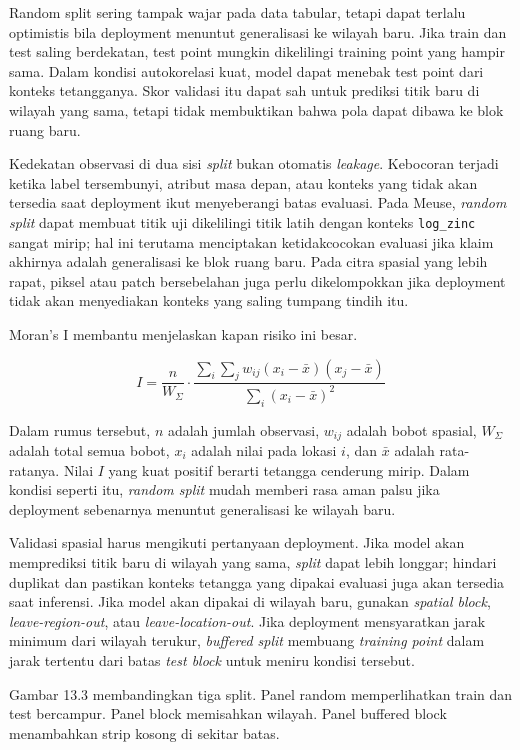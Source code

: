 Random split sering tampak wajar pada data tabular, tetapi dapat terlalu optimistis bila deployment menuntut generalisasi ke wilayah baru. Jika train dan test saling berdekatan, test point mungkin dikelilingi training point yang hampir sama. Dalam kondisi autokorelasi kuat, model dapat menebak test point dari konteks tetangganya. Skor validasi itu dapat sah untuk prediksi titik baru di wilayah yang sama, tetapi tidak membuktikan bahwa pola dapat dibawa ke blok ruang baru.

Kedekatan observasi di dua sisi \emph{split} bukan otomatis \emph{leakage}. Kebocoran terjadi ketika label tersembunyi, atribut masa depan, atau konteks yang tidak akan tersedia saat deployment ikut menyeberangi batas evaluasi. Pada Meuse, \emph{random split} dapat membuat titik uji dikelilingi titik latih dengan konteks \passthrough{\lstinline!log_zinc!} sangat mirip; hal ini terutama menciptakan ketidakcocokan evaluasi jika klaim akhirnya adalah generalisasi ke blok ruang baru. Pada citra spasial yang lebih rapat, piksel atau patch bersebelahan juga perlu dikelompokkan jika deployment tidak akan menyediakan konteks yang saling tumpang tindih itu.

Moran's I membantu menjelaskan kapan risiko ini besar.

\[
I = \dfrac{n}{W_{\Sigma}} \cdot \dfrac{\sum_i \sum_j w_{ij}(x_i - \bar{x})(x_j - \bar{x})}{\sum_i (x_i - \bar{x})^2}
\]

Dalam rumus tersebut, \(n\) adalah jumlah observasi, \(w_{ij}\) adalah bobot spasial, \(W_{\Sigma}\) adalah total semua bobot, \(x_i\) adalah nilai pada lokasi \(i\), dan \(\bar{x}\) adalah rata-ratanya. Nilai \(I\) yang kuat positif berarti tetangga cenderung mirip. Dalam kondisi seperti itu, \emph{random split} mudah memberi rasa aman palsu jika deployment sebenarnya menuntut generalisasi ke wilayah baru.

Validasi spasial harus mengikuti pertanyaan deployment. Jika model akan memprediksi titik baru di wilayah yang sama, \emph{split} dapat lebih longgar; hindari duplikat dan pastikan konteks tetangga yang dipakai evaluasi juga akan tersedia saat inferensi. Jika model akan dipakai di wilayah baru, gunakan \emph{spatial block}, \emph{leave-region-out}, atau \emph{leave-location-out}. Jika deployment mensyaratkan jarak minimum dari wilayah terukur, \emph{buffered split} membuang \emph{training point} dalam jarak tertentu dari batas \emph{test block} untuk meniru kondisi tersebut.

Gambar 13.3 membandingkan tiga split. Panel random memperlihatkan train dan test bercampur. Panel block memisahkan wilayah. Panel buffered block menambahkan strip kosong di sekitar batas.

